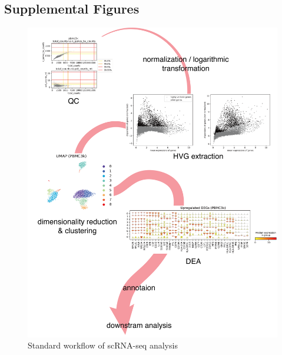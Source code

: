\documentclass{article}
\begin{document}
\subsection*{Supplemental Figures}
\begin{figure}[htb]
  \centering
  \includegraphics[scale=0.6]{./figs/exported/figure_s1.png}
  \caption{Standard workflow of scRNA-seq analysis}
  \label{fig_s1}
\end{figure}
\end{document}
